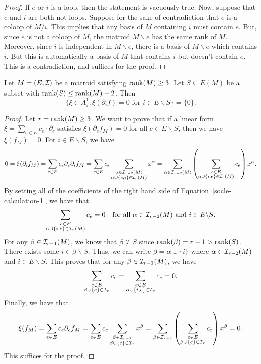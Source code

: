 \documentclass{puthesis-UG}
\begin{document}
\begin{proof}
	If $e$ or $i$ is a loop, then the statement is vacuously true. Now, suppose that $e$ and $i$ are both not loops. Suppose for the sake of contradiction that $e$ is a coloop of $M/i$. This implies that any basis of $M$ containing $i$ must contain $e$. But, since $e$ is not a coloop of $M$, the matroid $M \backslash e$ has the same rank of $M$. Moreover, since $i$ is independent in $M \backslash e$, there is a basis of $M \backslash e$ which contains $i$. But this is automatically a basis of $M$ that contains $i$ but doesn't contain $e$. This is a contradiction, and suffices for the proof. 
\end{proof}

\begin{thm} \label{socle-socle-socle}
	Let $M = (E, \mathcal{I})$ be a matroid satisfying $\operatorname{rank} (M) \geq 3$. Let $S \subseteq E(M)$ be a subset with $\operatorname{rank} (S) \leq \operatorname{rank} (M)-2$. Then 
	\[
		\{\xi \in A_f^1 : \xi (\partial_i f) = 0 \text{ for } i \in E \backslash S\} = \{0\}.
	\]
\end{thm}

\begin{proof}
	Let $r = \operatorname{rank} (M) \geq 3$. We want to prove that if a linear form $\xi = \sum_{e \in E} c_e \cdot \partial_e$ satisfies $\xi (\partial_e f_M) = 0$ for all $e \in E \backslash S$, then we have $\xi (f_M) = 0$. For $i \in E \backslash S$, we have 
	\begin{equation} \label{socle-calculation-1}
		0 = \xi (\partial_i f_M) = \sum_{e \in E} c_e \partial_e \partial_i f_M = \sum_{e \in E} c_e \sum_{\substack{\alpha \in \mathcal{I}_{r-2}(M) \\ \alpha \cup \{e,i\} \in \mathcal{I}_r (M)}} x^\alpha = \sum_{\alpha \in \mathcal{I}_{r-2}(M)} \left ( \sum_{\substack{e \in E \\ \alpha \cup \{i, e\} \in \mathcal{I}_r(M)}} c_e \right ) x^\alpha. 
	\end{equation}
	By setting all of the coefficients of the right hand side of Equation~\ref{socle-calculation-1}, we have that 
	\[
		\sum_{\substack{e \in E \\ \alpha \cup \{i, e\} \in \mathcal{I}_r (M)}} c_e = 0 \quad \text{for all $\alpha \in \mathcal{I}_{r-2}(M)$ and $i \in E \backslash S$}.
	\]
	For any $\beta \in \mathcal{I}_{r-1}(M)$, we know that $\beta \not \subseteq S$ since $\operatorname{rank} (\beta) = r-1 > \operatorname{rank} (S)$. There exists some $i \in \beta \backslash S$. Thus, we can write $\beta = \alpha \cup \{i\}$ where $\alpha \in \mathcal{I}_{r-2}(M)$ and $i \in E \backslash S$. This proves that for any $\beta \in \mathcal{I}_{r-1}(M)$, we have
	\[
		\sum_{\substack{e \in E \\ \beta \cup \{e\} \in \mathcal{I}_{r}}} c_e = \sum_{\substack{e \in E \\ \alpha \cup \{i, e\} \in \mathcal{I}_{r}}} c_e = 0.
	\]
	Finally, we have that 
	\[
		\xi(f_M) = \sum_{e \in E} c_e \partial_e f_M = \sum_{e \in E} c_e \sum_{\substack{\beta \in \mathcal{I}_{r-1} \\ \beta \cup \{e\} \in \mathcal{I}_r}} x^\beta = \sum_{\beta \in \mathcal{I}_{r-1}} \left ( \sum_{\substack{e \in E \\ \beta \cup \{e\} \in \mathcal{I}_r}} c_e \right ) x^\beta = 0.
	\]
	This suffices for the proof. 
\end{proof}
\end{document}
